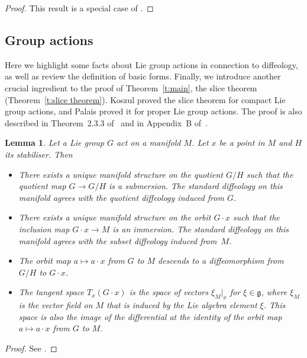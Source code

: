 \documentclass[11pt]{article}
\numberwithin{equation}{section}
\newtheorem{Lemma}[Theorem]{Lemma}
\newcommand{\g}{{\mathfrak{g}}} %
\begin{document}
\begin{proof}
This result is a special case of \cite[Section~6.38]{iglesias}.
\end{proof}

\subsection*{Group actions}

Here we highlight some facts about Lie group actions in connection to dif\/feology, as well as review the def\/inition of basic forms. Finally, we introduce another crucial ingredient to the proof of Theorem~\ref{t:main}, the slice theorem (Theorem~\ref{t:slice theorem}). Koszul \cite{koszul} proved the slice theorem for compact Lie group actions, and
Palais \cite{palais} proved it for proper Lie group actions.
The proof is also described in Theorem~2.3.3 of~\cite{DK}
and in Appendix~B of~\cite{GGK}.

\begin{Lemma} \label{facts}
Let a Lie group $G$ act on a manifold $M$.
Let $x$ be a point in $M$ and $H$ its stabiliser. Then
\begin{itemize}\itemsep=0pt
\item
There exists a unique manifold structure on the quotient $G/H$
such that the quotient map $G \to G/H$ is a submersion.
The standard diffeology on this manifold
agrees with the quotient diffeology induced from $G$.

\item
There exists a unique manifold structure on the orbit $G \cdot x$
such that the inclusion map $G \cdot x \to M$ is an immersion.
The standard diffeology on this manifold agrees with the subset diffeology
induced from~$M$.

\item
The orbit map $a \mapsto a \cdot x$ from $G$ to $M$
descends to a diffeomorphism from $G/H$ to $G \cdot x$.

\item
The tangent space $T_x(G \cdot x)$
is the space of vectors $\xi_M|_x$ for $\xi \in \g$,
where $\xi_M$ is the vector field on $M$ that is induced
by the Lie algebra element $\xi$.
This space is also the image of the differential at the identity
of the orbit map $a \mapsto a \cdot x$ from $G$ to $M$.
\end{itemize}
\end{Lemma}

\begin{proof}
See \cite[Section~2, Paragraph~1]{IK}.
\end{proof}
\end{document}
